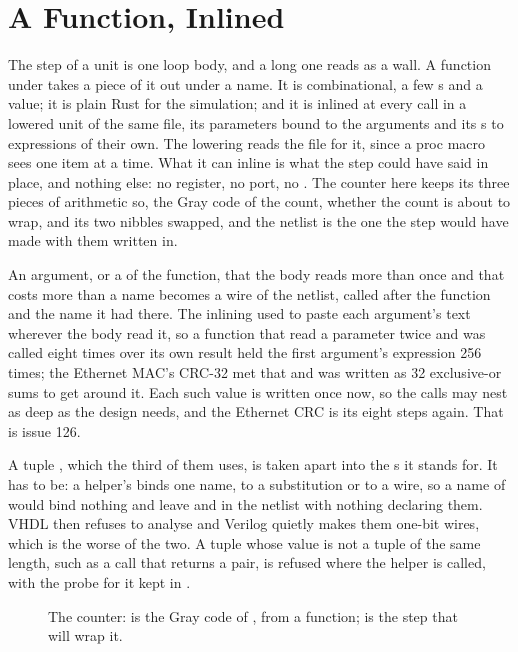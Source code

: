 \section{A Function, Inlined}
\label{sec:x-fn}

The step of a unit is one loop body, and a long one reads as a wall.
A function under \code{\#[lower]} takes a piece of it out under a
name. It is combinational, a few s and a value; it is plain
Rust for the simulation; and it is inlined at every call in a
lowered unit of the same file, its parameters bound to the arguments
and its s to expressions of their own. The lowering reads
the file for it, since a proc macro sees one item at a time. What it
can inline is what the step could have said in place, and nothing
else: no register, no port, no . The counter here keeps
its three pieces of arithmetic so, the Gray code of the count,
whether the count is about to wrap, and its two nibbles swapped, and
the netlist is the one the step would have made with them written in.

An argument, or a  of the function, that the body reads
more than once and that costs more than a name becomes a wire of the
netlist, called after the function and the name it had there. The
inlining used to paste each argument's text wherever the body read
it, so a function that read a parameter twice and was called eight
times over its own result held the first argument's expression 256
times; the Ethernet MAC's CRC-32 met that and was written as 32
exclusive-or sums to get around it. Each such value is written once
now, so the calls may nest as deep as the design needs, and the
Ethernet CRC is its eight steps again. That is issue 126.

A tuple , which the third of them uses, is taken apart into
the s it stands for. It has to be: a helper's 
binds one name, to a substitution or to a wire, so a name of
 would bind nothing and leave  and  in the
netlist with nothing declaring them. VHDL then refuses to analyse and
Verilog quietly makes them one-bit wires, which is the worse of the
two. A tuple whose value is not a tuple of the same length, such as a
call that returns a pair, is refused where the helper is called, with
the probe for it kept in .

\begin{figure}[htbp]
\centering

\caption{The counter:  is the Gray code of , from
a function;  is the step that will wrap it.}
\label{fig:x-fn}
\end{figure}





